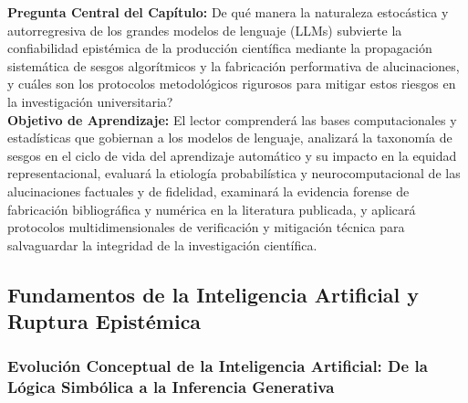 \begin{cajabeige}
\textbf{Pregunta Central del Capítulo:} \textquestiondown De qué manera la naturaleza estocástica y autorregresiva de los grandes modelos de lenguaje (LLMs) subvierte la confiabilidad epistémica de la producción científica mediante la propagación sistemática de sesgos algorítmicos y la fabricación performativa de alucinaciones, y cuáles son los protocolos metodológicos rigurosos para mitigar estos riesgos en la investigación universitaria?\\[0.3cm]
\textbf{Objetivo de Aprendizaje:} El lector comprenderá las bases computacionales y estadísticas que gobiernan a los modelos de lenguaje, analizará la taxonomía de sesgos en el ciclo de vida del aprendizaje automático y su impacto en la equidad representacional, evaluará la etiología probabilística y neurocomputacional de las alucinaciones factuales y de fidelidad, examinará la evidencia forense de fabricación bibliográfica y numérica en la literatura publicada, y aplicará protocolos multidimensionales de verificación y mitigación técnica para salvaguardar la integridad de la investigación científica.
\end{cajabeige}


\vspace{0.4cm}

\subsection{Fundamentos de la Inteligencia Artificial y Ruptura Epistémica}

\subsubsection{Evolución Conceptual de la Inteligencia Artificial: De la Lógica Simbólica a la Inferencia Generativa}

